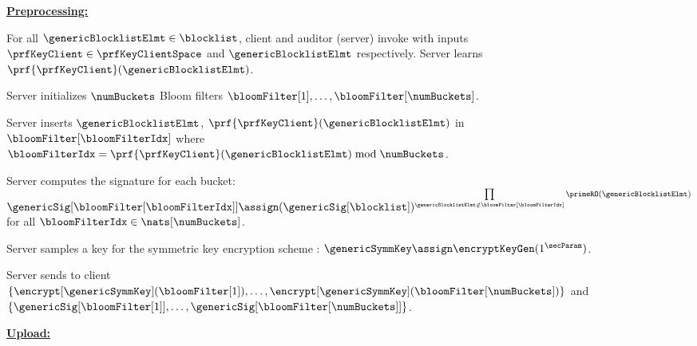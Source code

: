 \begin{figure}
\footnotesize
	\begin{mdframed}
\smallskip\noindent\textbf{\underline{Preprocessing:}}

\enumListStart

\item \label{nf:pre:oprf} For all $\genericBlocklistElmt \in \blocklist$, client and auditor (server) invoke \oprfFunc with inputs $\prfKeyClient \in \prfKeyClientSpace$ and $\genericBlocklistElmt$ respectively. Server learns $\prf{\prfKeyClient}(\genericBlocklistElmt)$. 

\item Server initializes $\numBuckets$ Bloom filters $\bloomFilter[1], \dots, \bloomFilter[\numBuckets]$.

\item Server inserts $\genericBlocklistElmt$, $\prf{\prfKeyClient}(\genericBlocklistElmt)$ in $\bloomFilter[\bloomFilterIdx]$ where $\bloomFilterIdx = \prf{\prfKeyClient}(\genericBlocklistElmt) \bmod \numBuckets$. 

\item Server computes the signature for each bucket: $\genericSig[\bloomFilter[\bloomFilterIdx]] \assign (\genericSig[\blocklist])^{\prod\limits_{\genericBlocklistElmt \notin \bloomFilter[\bloomFilterIdx]} \primeRO(\genericBlocklistElmt)}$ for all $\bloomFilterIdx \in \nats[\numBuckets]$.  


\item Server samples a key for the symmetric key encryption scheme \encryptionSchemeDefn: $\genericSymmKey \assign \encryptKeyGen(1^\secParam)$. 

\item Server sends to client $\{\encrypt[\genericSymmKey](\bloomFilter[1]), \dots, \encrypt[\genericSymmKey](\bloomFilter[\numBuckets])\}$ and $\{\genericSig[\bloomFilter[1]], \dots, \genericSig[\bloomFilter[\numBuckets]]\}$. 

\enumListEnd

\smallskip\noindent\textbf{\underline{Upload:}}

\enumListStart


\end{mdframed}
\end{figure}
